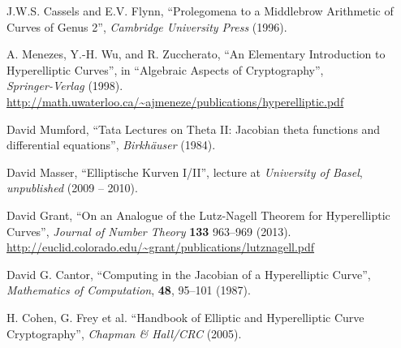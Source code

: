 \documentclass[english,11pt,a4paper]{article}
\begin{document}
\begin{thebibliography}{9}

J.W.S. Cassels and E.V. Flynn, ``Prolegomena to a Middlebrow \mbox{Arithmetic} of Curves of Genus 2'',
\emph{Cambridge University Press} (1996).

A. Menezes, Y.-H. Wu, and R. Zuccherato,
``An Elementary Introduction to Hyperelliptic Curves'',
in ``Algebraic Aspects of Cryptography'',\\
\emph{Springer-Verlag} (1998).\\
\small{\url{http://math.uwaterloo.ca/~ajmeneze/publications/hyperelliptic.pdf}}\normalsize

David Mumford,
``Tata Lectures on Theta II: Jacobian theta functions and differential equations'',
\emph{Birkhäuser} (1984).

David Masser,
``Elliptische Kurven I/II'', lecture at
\emph{University of Basel},
\emph{unpublished} (2009 -- 2010).

David Grant,
``On an Analogue of the Lutz-Nagell Theorem for \mbox{Hyperelliptic} Curves'',
\emph{Journal of Number Theory}
\textbf{133} 963--969 (2013).\\
\small{\url{http://euclid.colorado.edu/~grant/publications/lutznagell.pdf}}\normalsize

David G. Cantor, ``Computing  in the Jacobian  of a Hyperelliptic  Curve'',
\emph{Mathematics of Computation},
\textbf{48}, 95--101 (1987).%

H. Cohen, G. Frey et al. ``Handbook of Elliptic and Hyperelliptic Curve Cryptography'',
\emph{Chapman \& Hall/CRC} (2005).

\end{thebibliography}



\end{document}
